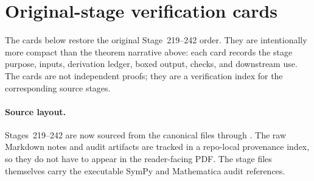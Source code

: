 \section{Original-stage verification cards}
\label{sec:app-part07-original-stage-verification-cards}

The cards below restore the original Stage~219--242 order.  They are intentionally more compact than the theorem narrative above: each card records the stage purpose, inputs, derivation ledger, boxed output, checks, and downstream use.  The cards are not independent proofs; they are a verification index for the corresponding source stages.



\paragraph{Source layout.}
Stages~219--242 are now sourced from the canonical files  through .  The raw Markdown notes and audit artifacts are tracked in a repo-local provenance index, so they do not have to appear in the reader-facing PDF.  The stage files themselves carry the executable SymPy and Mathematica audit references.

\begingroup
\let\clearpage\relax

\clearpage

\clearpage

\clearpage

\clearpage

\clearpage

\clearpage

\clearpage

\clearpage

\clearpage

\clearpage

\clearpage

\clearpage

\clearpage

\clearpage

\clearpage

\clearpage

\clearpage

\clearpage

\clearpage

\clearpage

\clearpage

\clearpage

\clearpage

\endgroup
